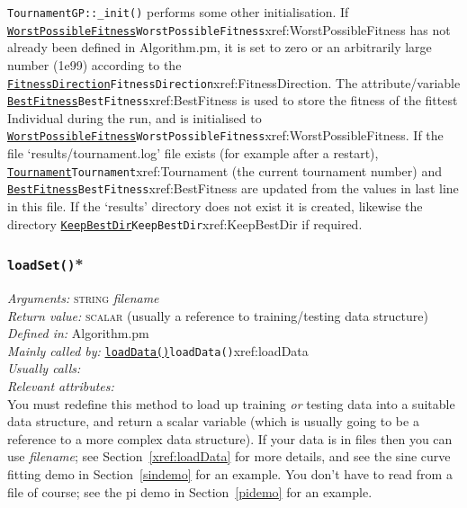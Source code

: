 \documentclass[a4paper]{article}
\begin{document}
\texttt{TournamentGP::\_init()} performs some other initialisation.
If \hyperref[no]{\texttt{WorstPossibleFitness}}{\texttt{WorstPossibleFitness}}{xref:WorstPossibleFitness} has not already been defined in
Algorithm.pm, it is set to zero or an arbitrarily large number (1e99)
according to the \hyperref[no]{\texttt{FitnessDirection}}{\texttt{FitnessDirection}}{xref:FitnessDirection}.  The attribute/variable
\hyperref[no]{\texttt{BestFitness}}{\texttt{BestFitness}}{xref:BestFitness} is used to store the fitness of the fittest
Individual during the run, and is initialised to
\hyperref[no]{\texttt{WorstPossibleFitness}}{\texttt{WorstPossibleFitness}}{xref:WorstPossibleFitness}.  If the file `results/tournament.log'
file exists (for example after a restart), \hyperref[no]{\texttt{Tournament}}{\texttt{Tournament}}{xref:Tournament} (the
current tournament number) and \hyperref[no]{\texttt{BestFitness}}{\texttt{BestFitness}}{xref:BestFitness} are updated from
the values in last line in this file.  If the `results' directory does
not exist it is created, likewise the directory \hyperref[no]{\texttt{KeepBestDir}}{\texttt{KeepBestDir}}{xref:KeepBestDir}
if required.

\subsubsection{\texttt{loadSet()}*}\label{xref:loadSet}
\textit{Arguments:} \textsc{string} \textit{filename}\\
\textit{Return value:} \textsc{scalar} (usually a reference to training/testing data structure)\\
\textit{Defined in:} Algorithm.pm\\
\textit{Mainly called by:} \hyperref[no]{\texttt{loadData()}}{\texttt{loadData()}}{xref:loadData}\\
\textit{Usually calls:} \\
\textit{Relevant attributes:} \\

You must redefine this method to load up training \emph{or} testing
data into a suitable data structure, and return a scalar variable
(which is usually going to be a reference to a more complex data
structure). If your data is in files then you can use
\textit{filename}; see Section~\ref{xref:loadData} for more details, and
see the sine curve fitting demo in Section~\ref{sindemo} for an
example.  You don't have to read from a file of course; see the pi
demo in Section~\ref{pidemo} for an example.
\end{document}
